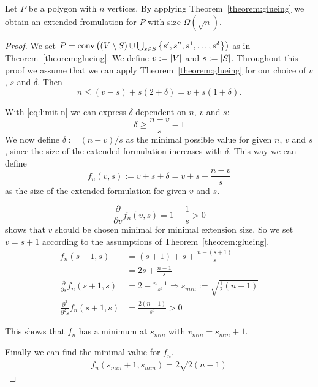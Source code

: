 \begin{observation}\label{observation:limits-of-glueing}
  Let $P$ be a polygon with $n$ vertices. By applying Theorem~\ref{theorem:glueing} we obtain an extended fromulation for $P$ with size $\Omega(\sqrt{n})$.
\end{observation}
\begin{proof}
  We set $P = \operatorname{conv}\left( (V \setminus S) \cup \bigcup_{s \in S} \left\{ s',s'',s^1,\dots,s^\delta \right\} \right)$ as in Theorem~\ref{theorem:glueing}. We define $v := \lvert V\rvert$ and $s := \lvert S\rvert$. Throughout this proof we assume that we can apply Theorem~\ref{theorem:glueing} for our choice of $v$, $s$ and $\delta$. Then
  \begin{equation}\label{eq:limit-n}
    n \leq (v-s) + s(2+\delta) = v + s(1+\delta).
  \end{equation}

  With \eqref{eq:limit-n} we can express $\delta$ dependent on $n$, $v$ and $s$:
  \begin{equation*}
    \delta \geq \frac{n-v}{s} - 1
  \end{equation*}
  We now define $\delta := (n-v)/s$ as the minimal possible value for given $n$, $v$ and $s$, since the size of the extended formulation increases with $\delta$. This way we can define $$f_n(v,s) := v + s + \delta = v + s + \frac{n-v}{s}$$ as the size of the extended formulation for given $v$ and $s$.

  $$\frac{\partial}{\partial v} f_n(v,s) = 1 - \frac{1}{s} > 0$$ shows that $v$ should be chosen minimal for minimal extension size. So we set $v = s+1$ according to the assumptions of Theorem~\ref{theorem:glueing}.
  \begin{align*}
    f_n(s+1, s) &= (s+1) + s + \frac{n-(s+1)}{s} \\
    &= 2s + \frac{n-1}{s}\\
    \frac{\partial}{\partial s} f_n(s+1,s) &= 2 - \frac{n-1}{s^2} \Rightarrow s_{min} := \sqrt{\frac{1}{2}(n-1)} \\
    \frac{\partial^2}{\partial^2 s} f_n(s+1,s) &= \frac{2(n-1)}{s^3} > 0
  \end{align*}

  This shows that $f_n$ has a minimum at $s_{min}$ with $v_{min}=s_{min}+1$.

  Finally we can find the minimal value for $f_n$.
  \begin{align*}
    f_n(s_{min}+1, s_{min}) = 2\sqrt{2(n-1)}
  \end{align*}
\end{proof}



